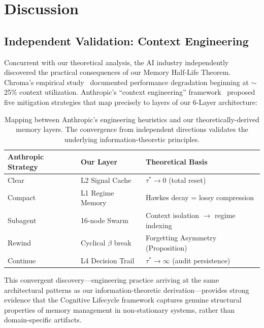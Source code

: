 \documentclass[11pt, a4paper]{article}
\begin{document}
\section{Discussion}

\subsection{Independent Validation: Context Engineering}

Concurrent with our theoretical analysis, the AI industry independently discovered the practical consequences of our Memory Half-Life Theorem. Chroma's empirical study~\cite{hong2025contextrot} documented performance degradation beginning at $\sim$25\% context utilization. Anthropic's ``context engineering'' framework~\cite{anthropic2025context} proposed five mitigation strategies that map precisely to layers of our 6-Layer architecture:

\begin{table}[H]
\centering
\small
\begin{tabular}{lll}
\toprule
\textbf{Anthropic Strategy} & \textbf{Our Layer} & \textbf{Theoretical Basis} \\
\midrule
Clear & L2 Signal Cache & $\tau^* \to 0$ (total reset) \\
Compact & L1 Regime Memory & Hawkes decay = lossy compression \\
Subagent & 16-node Swarm & Context isolation $\to$ regime indexing \\
Rewind & Cyclical $\beta$ break & Forgetting Asymmetry (Proposition) \\
Continue & L4 Decision Trail & $\tau^* \to \infty$ (audit persistence) \\
\bottomrule
\end{tabular}
\caption{Mapping between Anthropic's engineering heuristics and our theoretically-derived memory layers. The convergence from independent directions validates the underlying information-theoretic principles.}
\end{table}

This convergent discovery---engineering practice arriving at the same architectural patterns as our information-theoretic derivation---provides strong evidence that the Cognitive Lifecycle framework captures genuine structural properties of memory management in non-stationary systems, rather than domain-specific artifacts.
\end{document}
